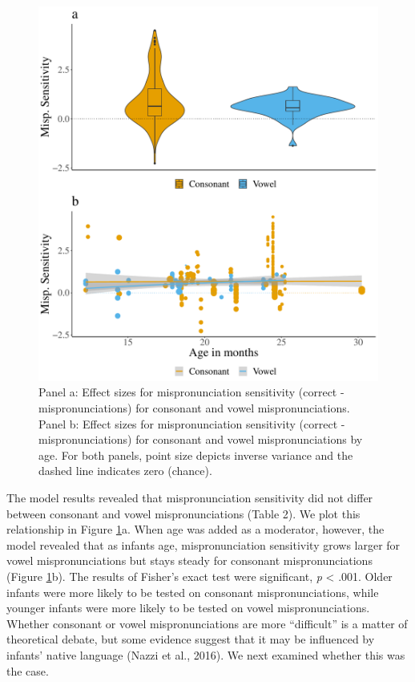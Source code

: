 \documentclass[man, noextraspace]{apa6}
\begin{document}
\begin{figure}
\centering
\includegraphics{VonHolzenBergmann_MPMetaAnalysis_files/figure-latex/PlotMispType-1.pdf}
\caption{\label{fig:PlotMispType}Panel a: Effect sizes for mispronunciation sensitivity (correct - mispronunciations) for consonant and vowel mispronunciations. Panel b: Effect sizes for mispronunciation sensitivity (correct - mispronunciations) for consonant and vowel mispronunciations by age. For both panels, point size depicts inverse variance and the dashed line indicates zero (chance).}
\end{figure}

The model results revealed that mispronunciation sensitivity did not differ between consonant and vowel mispronunciations (Table 2). We plot this relationship in Figure \ref{fig:PlotMispType}a. When age was added as a moderator, however, the model revealed that as infants age, mispronunciation sensitivity grows larger for vowel mispronunciations but stays steady for consonant mispronunciations (Figure \ref{fig:PlotMispType}b). The results of Fisher's exact test were significant, \emph{p} \textless{} .001. Older infants were more likely to be tested on consonant mispronunciations, while younger infants were more likely to be tested on vowel mispronunciations. Whether consonant or vowel mispronunciations are more \enquote{difficult} is a matter of theoretical debate, but some evidence suggest that it may be influenced by infants' native language (Nazzi et al., 2016). We next examined whether this was the case.
\end{document}
